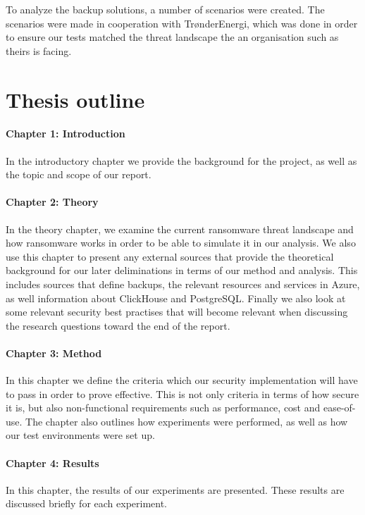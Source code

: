 To analyze the backup solutions, a number of scenarios were created. 
The scenarios were made in cooperation with TrønderEnergi,
which was done in order to ensure our tests matched the threat 
landscape the an organisation such as theirs is facing. 



\section{Thesis outline}

\paragraph{Chapter 1: Introduction} 
In the introductory chapter we provide the background for the project,
as well as the topic and scope of our report.

\paragraph{Chapter 2: Theory} 
In the theory chapter,
we examine the current ransomware threat landscape and how 
ransomware works in order to be able to simulate it in our analysis.
We also use this chapter to present any external sources that 
provide the theoretical background for our later deliminations in terms of our method and analysis.
This includes sources that define backups,
the relevant resources and services in Azure,
as well information about ClickHouse and PostgreSQL.
Finally we also look at some relevant security best practises 
that will become relevant when discussing the research questions toward the end of the report. 

\paragraph{Chapter 3: Method} 
In this chapter we define the criteria which our security implementation will have to pass in order to prove effective.
This is not only criteria in terms of how secure it is,
but also non-functional requirements such as performance, cost and ease-of-use.
The chapter also outlines how experiments were performed,
as well as how our test environments were set up. 

\paragraph{Chapter 4: Results} 
In this chapter, the results of our experiments are presented.
These results are discussed briefly for each experiment. 


